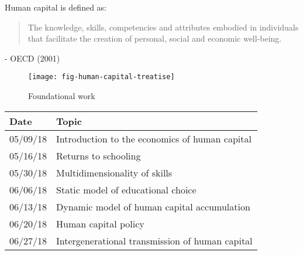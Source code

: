 \begin{frame}
Human capital is defined as: 
\vspace{\baselineskip}

\begin{quote}
The knowledge, skills, competencies and attributes embodied in individuals that facilitate
the creation of personal, social and economic well-being.
\end{quote}\vspace{-0.5pt} \hspace{6cm} - OECD (2001)
\end{frame}

\begin{frame}
	\begin{figure}
		\caption{Foundational work}
		\centering\texttt{[image: fig-human-capital-treatise]}
	\end{figure}
\end{frame}


\begin{frame}
\centering
\begin{threeparttable}\footnotesize
  \caption{Lecture plan}
  \begin{tabular}{ll}\toprule
  Date & Topic \\\midrule
05/09/18 & Introduction to the economics of human capital\\
05/16/18 & Returns to schooling \\
05/30/18 & Multidimensionality of skills \\
06/06/18 & Static model of educational choice \\
06/13/18 & Dynamic model of human capital accumulation \\
06/20/18 & Human capital policy \\
06/27/18 & Intergenerational transmission of human capital\\
\bottomrule
\end{tabular}
\end{threeparttable}
\end{frame}

